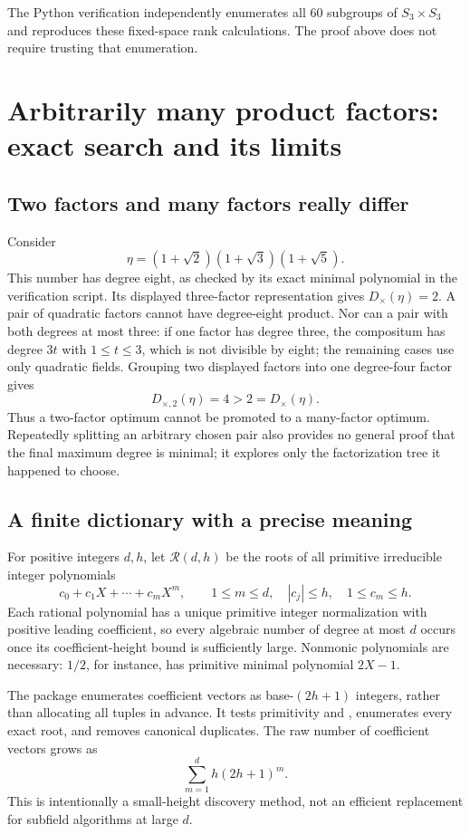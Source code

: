 \documentclass[11pt,a4paper]{article}
\theoremstyle{definition}\newtheorem{definition}[theorem]{Definition}
\theoremstyle{remark}\newtheorem{remark}[theorem]{Remark}
\newcommand{\Dtimes}{D_{\times}}
\newcommand{\Dtwo}{D_{\times,2}}
\newcommand{\code}[1]{\texttt{\detokenize{#1}}}
\begin{document}
The Python verification independently enumerates all 60 subgroups of
$S_3\times S_3$ and reproduces these fixed-space rank calculations. The
proof above does not require trusting that enumeration.

\section{Arbitrarily many product factors: exact search and its limits}
\label{sec:many}

\subsection{Two factors and many factors really differ}

Consider
\[
 \eta=(1+\sqrt2)(1+\sqrt3)(1+\sqrt5).
\]
This number has degree eight, as checked by its exact minimal polynomial in
the verification script. Its displayed three-factor representation gives
$\Dtimes(\eta)=2$. A pair of quadratic factors cannot have degree-eight
product. Nor can a pair with both degrees at most three: if one factor has
degree three, the compositum has degree $3t$ with $1\le t\le3$, which is
not divisible by eight; the remaining cases use only quadratic fields.
Grouping two displayed factors into one degree-four factor gives
\[
 \Dtwo(\eta)=4>2=\Dtimes(\eta).
\]
Thus a two-factor optimum cannot be promoted to a many-factor optimum.
Repeatedly splitting an arbitrary chosen pair also provides no general
proof that the final maximum degree is minimal; it explores only the
factorization tree it happened to choose.

\subsection{A finite dictionary with a precise meaning}

For positive integers $d,h$, let $\mathcal R(d,h)$ be the roots of all
primitive irreducible integer polynomials
\[
 c_0+c_1X+\cdots+c_mX^m,\qquad
 1\le m\le d,\quad |c_j|\le h,\quad 1\le c_m\le h.
\]
Each rational polynomial has a unique primitive integer normalization with
positive leading coefficient, so every algebraic number of degree at most
$d$ occurs once its coefficient-height bound is sufficiently large.
Nonmonic polynomials are necessary: $1/2$, for instance, has primitive
minimal polynomial $2X-1$.

The package enumerates coefficient vectors as base-$(2h+1)$ integers,
rather than allocating all tuples in advance. It tests primitivity and
\code{IrreduciblePolynomialQ}, enumerates every exact root, and removes
canonical duplicates. The raw number of coefficient vectors grows as
\[
 \sum_{m=1}^{d}h(2h+1)^m.
\]
This is intentionally a small-height discovery method, not an efficient
replacement for subfield algorithms at large $d$.
\end{document}
